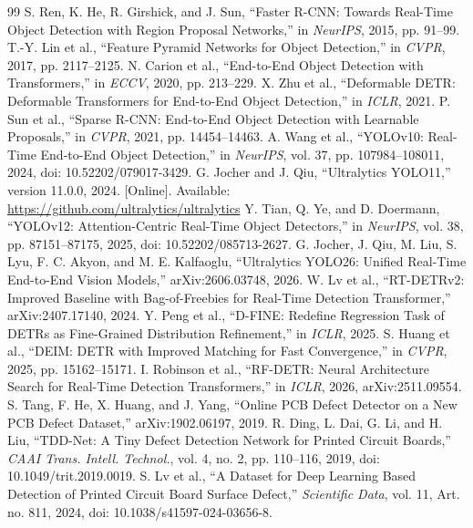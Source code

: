 \documentclass[conference]{IEEEtran}
\begin{document}
\begin{thebibliography}{99}
\fontsize{7.8}{9.0}\selectfont
\setlength{\itemsep}{0pt}
\setlength{\parskip}{0pt}
 S. Ren, K. He, R. Girshick, and J. Sun, ``Faster R-CNN: Towards Real-Time Object Detection with Region Proposal Networks,'' in \textit{NeurIPS}, 2015, pp. 91--99.
 T.-Y. Lin et al., ``Feature Pyramid Networks for Object Detection,'' in \textit{CVPR}, 2017, pp. 2117--2125.
 N. Carion et al., ``End-to-End Object Detection with Transformers,'' in \textit{ECCV}, 2020, pp. 213--229.
 X. Zhu et al., ``Deformable DETR: Deformable Transformers for End-to-End Object Detection,'' in \textit{ICLR}, 2021.
 P. Sun et al., ``Sparse R-CNN: End-to-End Object Detection with Learnable Proposals,'' in \textit{CVPR}, 2021, pp. 14454--14463.
 A. Wang et al., ``YOLOv10: Real-Time End-to-End Object Detection,'' in \textit{NeurIPS}, vol. 37, pp. 107984--108011, 2024, doi: 10.52202/079017-3429.
 G. Jocher and J. Qiu, ``Ultralytics YOLO11,'' version 11.0.0, 2024. [Online]. Available: \url{https://github.com/ultralytics/ultralytics}
 Y. Tian, Q. Ye, and D. Doermann, ``YOLOv12: Attention-Centric Real-Time Object Detectors,'' in \textit{NeurIPS}, vol. 38, pp. 87151--87175, 2025, doi: 10.52202/085713-2627.
 G. Jocher, J. Qiu, M. Liu, S. Lyu, F. C. Akyon, and M. E. Kalfaoglu, ``Ultralytics YOLO26: Unified Real-Time End-to-End Vision Models,'' arXiv:2606.03748, 2026.
 W. Lv et al., ``RT-DETRv2: Improved Baseline with Bag-of-Freebies for Real-Time Detection Transformer,'' arXiv:2407.17140, 2024.
 Y. Peng et al., ``D-FINE: Redefine Regression Task of DETRs as Fine-Grained Distribution Refinement,'' in \textit{ICLR}, 2025.
 S. Huang et al., ``DEIM: DETR with Improved Matching for Fast Convergence,'' in \textit{CVPR}, 2025, pp. 15162--15171.
 I. Robinson et al., ``RF-DETR: Neural Architecture Search for Real-Time Detection Transformers,'' in \textit{ICLR}, 2026, arXiv:2511.09554.
 S. Tang, F. He, X. Huang, and J. Yang, ``Online PCB Defect Detector on a New PCB Defect Dataset,'' arXiv:1902.06197, 2019.
 R. Ding, L. Dai, G. Li, and H. Liu, ``TDD-Net: A Tiny Defect Detection Network for Printed Circuit Boards,'' \textit{CAAI Trans. Intell. Technol.}, vol. 4, no. 2, pp. 110--116, 2019, doi: 10.1049/trit.2019.0019.
 S. Lv et al., ``A Dataset for Deep Learning Based Detection of Printed Circuit Board Surface Defect,'' \textit{Scientific Data}, vol. 11, Art. no. 811, 2024, doi: 10.1038/s41597-024-03656-8.

\end{thebibliography}
\end{document}

